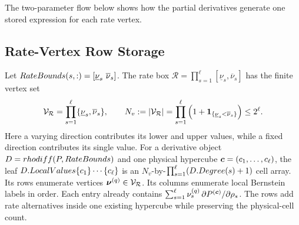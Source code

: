 The two-parameter flow below shows how the partial derivatives generate one stored expression for each rate vertex.

\begin{center}
\end{center}

\subsection{Rate-Vertex Row Storage}
\label{sec:bernstein-rate-vertex-storage}

Let $\code{RateBounds}(s,:)=[\underline\nu_s\ \overline\nu_s]$. The rate box $\mathcal R=\prod_{s=1}^{\ell}[\underline\nu_s,\overline\nu_s]$ has the finite vertex set
\begin{gather*}
  \mathcal V_{\mathcal R}
  =\prod_{s=1}^{\ell}\{\underline\nu_s,\overline\nu_s\},
  \qquad N_v:=|\mathcal V_{\mathcal R}|
  =\prod_{s=1}^{\ell}\left(1+\boldsymbol{1}_{\{\underline\nu_s<\overline\nu_s\}}\right)
  \le 2^\ell.
\end{gather*}
Here a varying direction contributes its lower and upper values, while a fixed direction contributes its single value. For a derivative object $D=rhodiff(P,RateBounds)$ and one physical hypercube $\boldsymbol{c}=(c_1,\ldots,c_\ell)$, the leaf $D.LocalValues\{c_1\}\cdots\{c_\ell\}$ is an $N_v$-by-$\prod_{s=1}^{\ell}(D.Degree(s)+1)$ cell array. Its rows enumerate vertices $\boldsymbol{\nu}^{(q)}\in\mathcal V_{\mathcal R}$. Its columns enumerate local Bernstein labels in  order. Each entry already contains $\sum_{s=1}^{\ell}\nu_s^{(q)}\,\partial P^{(\boldsymbol{c})}/\partial\rho_s$. The rows add rate alternatives inside one existing hypercube while preserving the physical-cell count.

